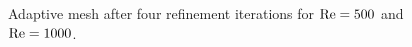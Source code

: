 \begin{figure}[!h]
\centering
{}
\caption{Adaptive mesh after four refinement iterations for $\Reyn = 500$ and $\Reyn = 1000$.}
\label{fig:MeshRe500}
\end{figure}
